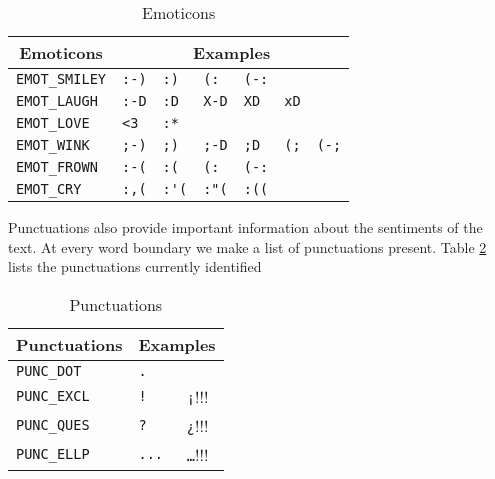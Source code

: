 \begin{table}[h]
\centering
	\begin{tabular}{|l|llllll|}
	
	\hline
		\multicolumn{1}{|c|}{Emoticons} &
		\multicolumn{6}{|c|}{Examples} \\
	\hline
	\verb+EMOT_SMILEY+ 	& \verb+:-)+ 	& \verb+:)+ 	& \verb+(:+ 	& \verb+(-:+ 	& \verb++ 	& \verb++ \\
	\verb+EMOT_LAUGH+ 	& \verb+:-D+ 	& \verb+:D+ 	& \verb+X-D+ 	& \verb+XD+ 	& \verb+xD+ 	& \verb++ \\
	\verb+EMOT_LOVE+ 	& \verb+<3+ 	& \verb+:*+ 	& \verb++ 	& \verb++ 	& \verb++ 	& \verb++ \\
	\verb+EMOT_WINK+ 	& \verb+;-)+ 	& \verb+;)+ 	& \verb+;-D+ 	& \verb+;D+ 	& \verb+(;+ 	& \verb+(-;+ \\
	\verb+EMOT_FROWN+ 	& \verb+:-(+ 	& \verb+:(+ 	& \verb+(:+ 	& \verb+(-:+ 	& \verb++ 	& \verb++ \\
	\verb+EMOT_CRY+ 	& \verb+:,(+ 	& \verb+:'(+ 	& \verb+:"(+ 	& \verb+:((+ 	& \verb++ 	& \verb++ \\
	\hline
	
	\end{tabular}
\caption{Emoticons}
\label{table:emot}
\end{table}


Punctuations also provide important information about the sentiments of the text.
At every word boundary we make a list of punctuations present.
Table \ref{table:punc} lists the punctuations currently identified

\begin{table}[h]
\centering
	\begin{tabular}{|l|ll|}
	
	\hline
		\multicolumn{1}{|c|}{Punctuations} &
		\multicolumn{2}{|c|}{Examples} \\
	\hline
	\verb+PUNC_DOT+ & \verb+.+ & \verb++ \\
	\verb+PUNC_EXCL+ & \verb+!+ & \verb+¡+!!! \\
	\verb+PUNC_QUES+ & \verb+?+ & \verb+¿+!!! \\
	\verb+PUNC_ELLP+ & \verb+...+ & \verb+…+!!! \\
	\hline

	\end{tabular}
\caption{Punctuations}
\label{table:punc}
\end{table}

